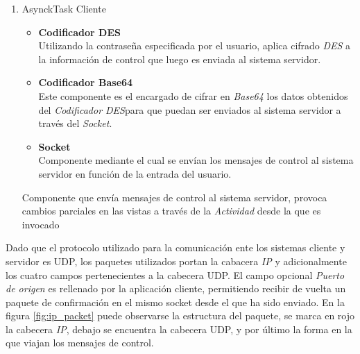 \documentclass[12pt]{article}
\begin{document}
\begin{enumerate}
\begin{itemize}
                    \end{itemize}
                \item AsynckTask Cliente
                    \begin{itemize}
                        \item \textbf{Codificador DES} \\
                            Utilizando la contraseña especificada por el usuario, aplica cifrado \textit{DES} a la información de control que luego es enviada al sistema servidor.
                        \item \textbf{Codificador Base64} \\
                            Este componente es el encargado de cifrar en \textit{Base64} los datos obtenidos del \textit{Codificador DES}para que puedan ser enviados al sistema servidor a través del \textit{Socket}.
                        \item \textbf{Socket} \\ 
                            Componente mediante el cual se envían los mensajes de control al sistema servidor en función de la entrada del usuario.
                    \end{itemize}
                    Componente que envía mensajes de control al sistema servidor, provoca cambios parciales en las vistas a través de la \textit{Actividad} desde la que es invocado
            \end{enumerate}

            Dado que el protocolo utilizado para la comunicación ente los sistemas cliente y servidor es UDP, los paquetes utilizados portan la cabacera \textit{IP} y adicionalmente los cuatro campos pertenecientes a la cabecera UDP. El campo opcional \textit{Puerto de origen} es rellenado por la aplicación cliente, permitiendo recibir de vuelta un paquete de confirmación en el mismo socket desde el que ha sido enviado. En la figura \ref{fig:ip_packet} puede observarse la estructura del paquete, se marca en rojo la cabecera \textit{IP}, debajo se encuentra la cabecera UDP, y por último la forma en la que viajan los mensajes de control.
\end{document}
